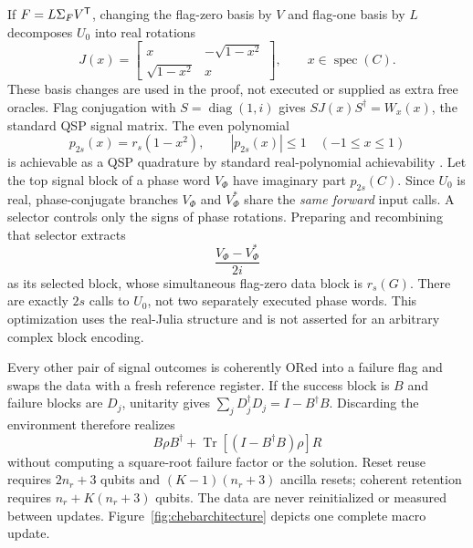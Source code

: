 \documentclass{ieeeaccess}
\newcommand{\Tr}{\operatorname{Tr}}\newcommand{\E}{\mathcal E}
\begin{document}
If $F=L\Sigma_FV^{\mathsf T}$, changing the flag-zero basis by $V$ and flag-one basis by $L$ decomposes $U_0$ into real rotations
\[
J(x)=\begin{bmatrix}x&-\sqrt{1-x^2}\\\sqrt{1-x^2}&x\end{bmatrix},\qquad x\in\operatorname{spec}(C).
\]
These basis changes are used in the proof, not executed or supplied as extra free oracles. Flag conjugation with $S=\operatorname{diag}(1,i)$ gives $SJ(x)S^\dagger=W_x(x)$, the standard QSP signal matrix. The even polynomial
\begin{equation}\label{eq:evenqsp}
p_{2s}(x)=r_s(1-x^2),\qquad |p_{2s}(x)|\le1\quad(-1\le x\le1)
\end{equation}
is achievable as a QSP quadrature by standard real-polynomial achievability \cite{r3,pyqsp}. Let the top signal block of a phase word $V_\Phi$ have imaginary part $p_{2s}(C)$. Since $U_0$ is real, phase-conjugate branches $V_\Phi$ and $V_\Phi^*$ share the \emph{same forward} input calls. A selector controls only the signs of phase rotations. Preparing and recombining that selector extracts
\begin{equation}\label{eq:quadrature}
\frac{V_\Phi-V_\Phi^*}{2i}
\end{equation}
as its selected block, whose simultaneous flag-zero data block is $r_s(G)$. There are exactly $2s$ calls to $U_0$, not two separately executed phase words. This optimization uses the real-Julia structure and is not asserted for an arbitrary complex block encoding.

Every other pair of signal outcomes is coherently ORed into a failure flag and swaps the data with a fresh reference register. If the success block is $B$ and failure blocks are $D_j$, unitarity gives $\sum_jD_j^\dagger D_j=I-B^\dagger B$. Discarding the environment therefore realizes
\[
B\rho B^\dagger+\Tr[(I-B^\dagger B)\rho]R
\]
without computing a square-root failure factor or the solution. Reset reuse requires $2n_r+3$ qubits and $(K-1)(n_r+3)$ ancilla resets; coherent retention requires $n_r+K(n_r+3)$ qubits. The data are never reinitialized or measured between updates. Figure~\ref{fig:chebarchitecture} depicts one complete macro update.
\end{document}
